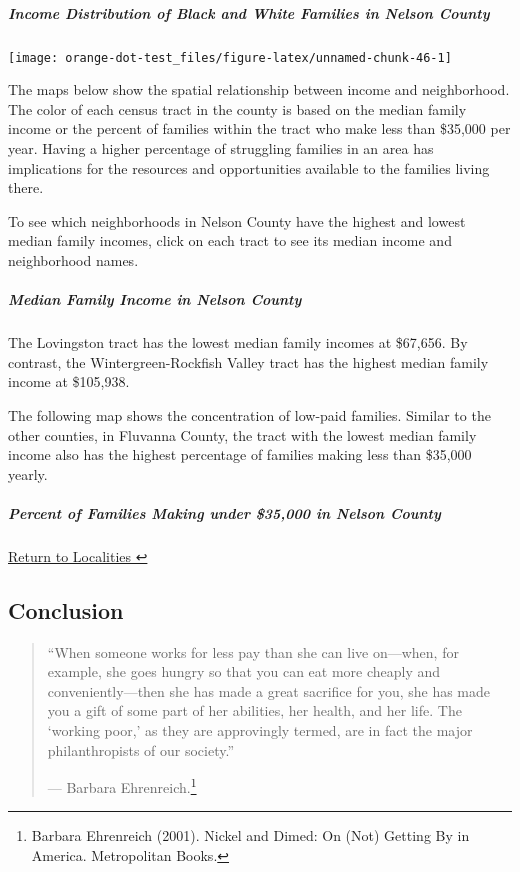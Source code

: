 \documentclass[
]{article}
\begin{document}
\hypertarget{income-distribution-of-black-and-white-families-in-nelson-county}{%
\subparagraph{Income Distribution of Black and White Families in Nelson
County}\label{income-distribution-of-black-and-white-families-in-nelson-county}}

\begin{center}\texttt{[image: orange-dot-test\_files/figure-latex/unnamed-chunk-46-1]} \end{center}

The maps below show the spatial relationship between income and
neighborhood. The color of each census tract in the county is based on
the median family income or the percent of families within the tract who
make less than \$35,000 per year. Having a higher percentage of
struggling families in an area has implications for the resources and
opportunities available to the families living there.

To see which neighborhoods in Nelson County have the highest and lowest
median family incomes, click on each tract to see its median income and
neighborhood names.

\hypertarget{median-family-income-in-nelson-county}{%
\subparagraph{Median Family Income in Nelson
County}\label{median-family-income-in-nelson-county}}

The Lovingston tract has the lowest median family incomes at \$67,656.
By contrast, the Wintergreen-Rockfish Valley tract has the highest
median family income at \$105,938.

The following map shows the concentration of low-paid families. Similar
to the other counties, in Fluvanna County, the tract with the lowest
median family income also has the highest percentage of families making
less than \$35,000 yearly.

\hypertarget{percent-of-families-making-under-35000-in-nelson-county}{%
\subparagraph{Percent of Families Making under \$35,000 in Nelson
County}\label{percent-of-families-making-under-35000-in-nelson-county}}

\protect\hyperlink{localities}{Return to Localities ↩︎}

\hypertarget{conclusion}{%
\subsection{Conclusion}\label{conclusion}}

\begin{quote}
``When someone works for less pay than she can live on---when, for
example, she goes hungry so that you can eat more cheaply and
conveniently---then she has made a great sacrifice for you, she has made
you a gift of some part of her abilities, her health, and her life. The
`working poor,' as they are approvingly termed, are in fact the major
philanthropists of our society.''

--- Barbara Ehrenreich.\footnote{Barbara Ehrenreich (2001). Nickel and
  Dimed: On (Not) Getting By in America. Metropolitan Books.}
\end{quote}
\end{document}
